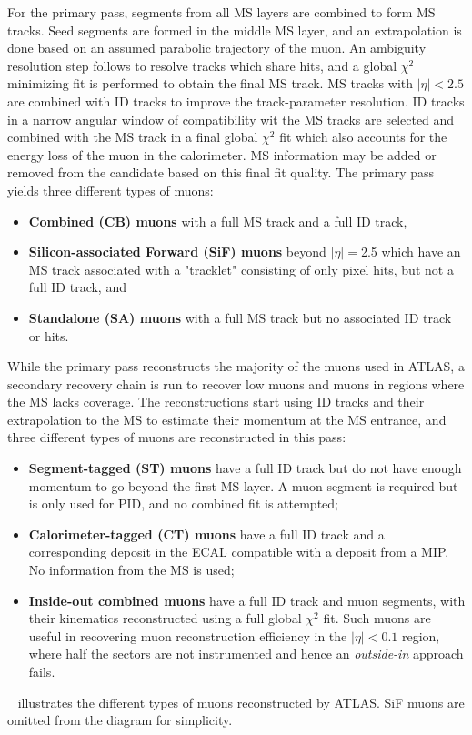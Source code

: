 For the primary pass, segments from all MS layers are combined to form MS tracks. Seed segments are formed in the middle MS layer, and an extrapolation is done based on an assumed parabolic trajectory of the muon. An ambiguity resolution step follows to resolve tracks which share hits, and a global $\chi^2$ minimizing fit is performed to obtain the final MS track. MS tracks with $|\eta|<2.5$ are combined with ID tracks to improve the track-parameter resolution. ID tracks in a narrow angular window of compatibility wit the MS tracks are selected and combined with the MS track in a final global $\chi^2$ fit which also accounts for the energy loss of the muon in the calorimeter. MS information may be added or removed from the candidate based on this final fit quality. The primary pass yields three different types of muons:
\begin{itemize}
    \item \textbf{Combined (CB) muons} with a full MS track and a full ID track,
    \item \textbf{Silicon-associated Forward (SiF) muons} beyond $|\eta|=$2.5 which have an MS track associated with a "tracklet" consisting of only pixel hits, but not a full ID track, and
    \item \textbf{Standalone (SA) muons} with a full MS track but no associated ID track or hits.
\end{itemize}

While the primary pass reconstructs the majority of the muons used in ATLAS, a secondary recovery chain is run to recover low \pT muons and muons in regions where the MS lacks coverage. The reconstructions start using ID tracks and their extrapolation to the MS to estimate their momentum at the MS entrance, and three different types of muons are reconstructed in this pass:
\begin{itemize}
    \item \textbf{Segment-tagged (ST) muons} have a full ID track but do not have enough momentum to go beyond the first MS layer. A muon segment is required but is only used for PID, and no combined fit is attempted;
    \item \textbf{Calorimeter-tagged (CT) muons} have a full ID track and a corresponding deposit in the ECAL compatible with a deposit from a MIP. No information from the MS is used;
    \item \textbf{Inside-out combined muons} have a full ID track and muon segments, with their kinematics reconstructed using a full global $\chi^2$ fit. Such muons are useful in recovering muon reconstruction efficiency in the $|\eta|<0.1$ region, where half the sectors are not instrumented and hence an \textit{outside-in} approach fails.
\end{itemize}
~ illustrates the different types of muons reconstructed by ATLAS. SiF muons are omitted from the diagram for simplicity.

